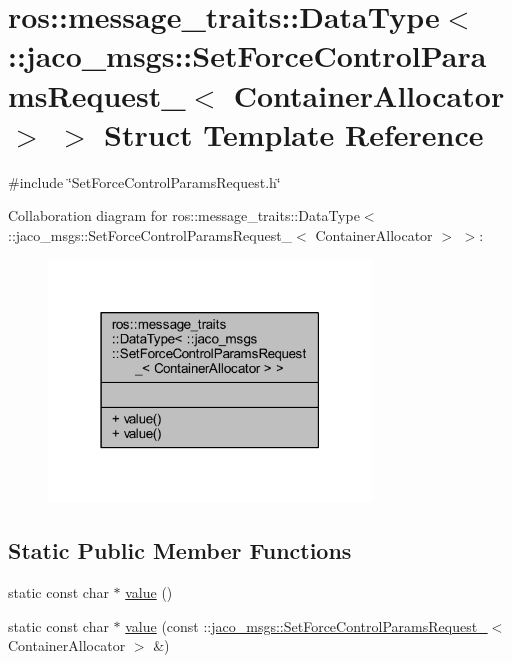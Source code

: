 \hypertarget{structros_1_1message__traits_1_1DataType_3_01_1_1jaco__msgs_1_1SetForceControlParamsRequest___3_01ContainerAllocator_01_4_01_4}{}\section{ros\+:\+:message\+\_\+traits\+:\+:Data\+Type$<$ \+:\+:jaco\+\_\+msgs\+:\+:Set\+Force\+Control\+Params\+Request\+\_\+$<$ Container\+Allocator $>$ $>$ Struct Template Reference}
\label{structros_1_1message__traits_1_1DataType_3_01_1_1jaco__msgs_1_1SetForceControlParamsRequest___3_01ContainerAllocator_01_4_01_4}


{\ttfamily \#include \char`\"{}Set\+Force\+Control\+Params\+Request.\+h\char`\"{}}



Collaboration diagram for ros\+:\+:message\+\_\+traits\+:\+:Data\+Type$<$ \+:\+:jaco\+\_\+msgs\+:\+:Set\+Force\+Control\+Params\+Request\+\_\+$<$ Container\+Allocator $>$ $>$\+:
\nopagebreak
\begin{figure}[H]
\begin{center}
\leavevmode
\includegraphics[width=243pt]{dd/dc7/structros_1_1message__traits_1_1DataType_3_01_1_1jaco__msgs_1_1SetForceControlParamsRequest___3_1b67454cc6b8aa2ce39d277ef30632b1}
\end{center}
\end{figure}
\subsection*{Static Public Member Functions}
\begin{DoxyCompactItemize}
\item 
static const char $\ast$ \hyperlink{structros_1_1message__traits_1_1DataType_3_01_1_1jaco__msgs_1_1SetForceControlParamsRequest___3_01ContainerAllocator_01_4_01_4_a04a30da1d26d17eda37a866d4ac7a0fb}{value} ()
\item 
static const char $\ast$ \hyperlink{structros_1_1message__traits_1_1DataType_3_01_1_1jaco__msgs_1_1SetForceControlParamsRequest___3_01ContainerAllocator_01_4_01_4_a7a967395f6e2a75b9f39fa6a6d1d59ee}{value} (const \+::\hyperlink{structjaco__msgs_1_1SetForceControlParamsRequest__}{jaco\+\_\+msgs\+::\+Set\+Force\+Control\+Params\+Request\+\_\+}$<$ Container\+Allocator $>$ \&)
\end{DoxyCompactItemize}


